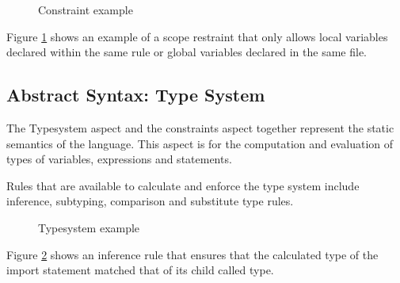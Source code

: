 \begin{figure}
    \centering
    \caption{Constraint example}
    \label{fig:constraint_example}
\end{figure}

Figure \ref{fig:constraint_example} shows an example of a scope restraint that only allows local variables declared within the same rule or global variables declared in the same file.
 
\subsection{Abstract Syntax: Type System}
The Typesystem aspect and the constraints aspect together represent the static semantics of the language.
This aspect is for the computation and evaluation of types of variables, expressions and statements.

Rules that are available to calculate and enforce the type system include inference, subtyping, comparison and substitute type rules.

\begin{figure}
    \centering
    \caption{Typesystem example}
    \label{fig:typesystem_example}
\end{figure}

Figure \ref{fig:typesystem_example} shows an inference rule that ensures that the calculated type of the import statement matched that of its child called type.


